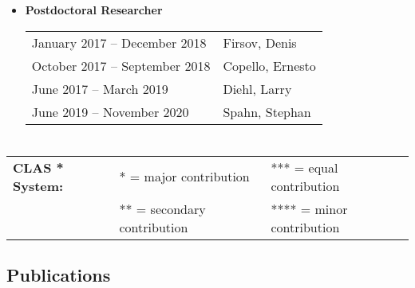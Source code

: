 \documentclass[10pt]{article}
\begin{document}
\begin{IOWA ONLY}
\begin{itemize}
\item[] \textbf{Postdoctoral Researcher}
\\[1.3ex]
\begin{tabular}{l@{\quad\ }p{30em}} 
 January 2017 -- December 2018
 & Firsov, Denis
 \\[3.5ex]
  October 2017 -- September 2018
 & Copello, Ernesto
 \\[3.5ex]
 June 2017 -- March 2019
 & Diehl, Larry
 \\[3.5ex]
 June 2019 -- November 2020
 & Spahn, Stephan
 \\[3.5ex]
\end{tabular}

\end{itemize}

\end{IOWA ONLY}


\section*{\scholarship}

\begin{IOWA ONLY}
\begin{center}
\begin{tabular}{lll}
{\bf CLAS * System:} & * = major contribution   &    *** = equal contribution \\
                     & ** = secondary contribution & **** = minor contribution
\end{tabular}
\end{center}
\end{IOWA ONLY}

\subsection*{Publications}
\smallskip

%
%
% 
%
\end{document}
